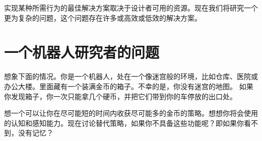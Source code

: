 
实现某种所需行为的最佳解决方案取决于设计者可用的资源。现在我们将研究一个更为复杂的问题，这个问题存在许多或高效或低效的解决方案。


\section{一个机器人研究者的问题}
想象下面的情况。你是一个机器人，处在一个像迷宫般的环境，比如仓库、医院或办公大楼。里面藏有一个装满金币的箱子。不幸的是，你没有迷宫的地图。 如果你发现箱子，你一次只能拿几个硬币，并把它们带到你的车停放的出口处。


\begin{framed}
想一个可以让你在尽可能短的时间内收获尽可能多的金币的策略。想想你将会使用的认知和感知能力。现在讨论替代策略，如果你不具备这些功能呢？即如果你看不到，没有记忆？
\end{framed}



